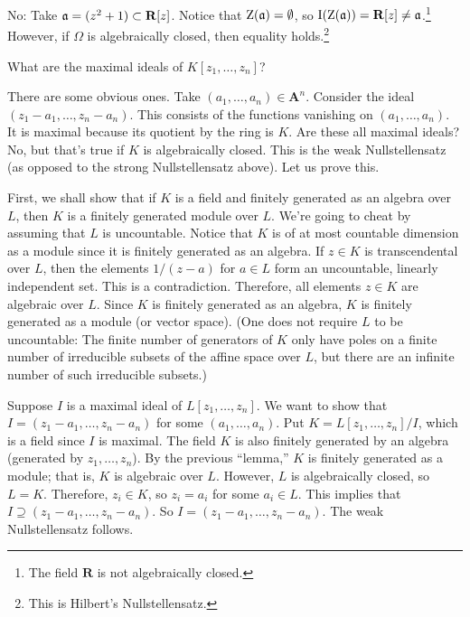 \documentclass [11 pt, oneside] {article}
\begin{document}
No: Take $\mathfrak{a} = (z^2 + 1) \subset \mathbf R[z]$. Notice that $\operatorname{Z}(\mathfrak{a})= \emptyset$, so $\operatorname{I}(\operatorname{Z}(\mathfrak{a})) = \mathbf{R}[z]\ne \mathfrak{a}$.\footnote{The field $\mathbf{R}$ is not algebraically closed.} However, if $\Omega$ is algebraically closed, then equality holds.\footnote{This is Hilbert's Nullstellensatz.}

\begin{problem}
	What are the maximal ideals of $K[z_1,\hdots, z_n]$?
\end{problem}

There are some obvious ones. Take $(a_1,\hdots, a_n)\in \mathbf{A}^n$. Consider the ideal $(z_1-a_1,\hdots, z_n-a_n)$. This consists of the functions vanishing on $(a_1,\hdots, a_n)$. It is maximal because its quotient by the ring is $K$. Are these all maximal ideals? No, but that's true if $K$ is algebraically closed. This is the weak Nullstellensatz  (as opposed to the strong Nullstellensatz above). Let us prove this.

First, we shall show that if $K$ is a field and finitely generated as an algebra over $L$, then $K$ is a finitely generated module over $L$. We're going to cheat by assuming that $L$ is uncountable. Notice that $K$ is of at most countable dimension as a module since it is finitely generated as an algebra. If $z\in K$ is transcendental over $L$, then the elements $1/(z-a)$ for $a\in L$ form an uncountable, linearly independent set. This is a contradiction. Therefore, all elements $z\in K$ are algebraic over $L$. Since $K$ is finitely generated as an algebra, $K$ is finitely generated as a module (or vector space). (One does not require $L$ to be uncountable: The finite number of generators of $K$ only have poles on a finite number of irreducible subsets of the affine space over $L$, but there are an infinite number of such irreducible subsets.)

Suppose $I$ is a maximal ideal of $L[z_1,\hdots, z_n]$. We want to show that $I = (z_1-a_1,\hdots, z_n-a_n)$ for some $(a_1,\hdots, a_n)$. Put $K = L[z_1,\hdots, z_n]/I$, which is a field since $I$ is maximal. The field $K$ is also finitely generated by an algebra (generated by $z_1,\hdots, z_n$). By  the previous ``lemma,'' $K$ is finitely generated as a module; that is, $K$ is algebraic over $L$. However, $L$ is algebraically closed, so $L=K$. Therefore, $z_i\in K$, so $z_i=a_i$ for some $a_i\in L$. This implies that $I\supseteq (z_1-a_1,\hdots, z_n-a_n)$. So $I = (z_1-a_1,\hdots, z_n-a_n)$. The weak Nullstellensatz follows.
\end{document}
